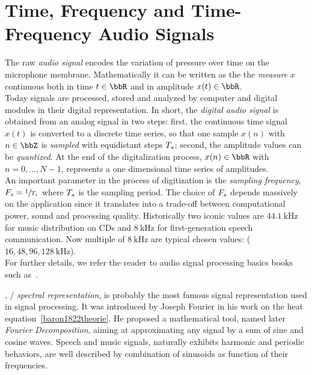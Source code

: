 \section{Time, Frequency and Time-Frequency Audio Signals}
The raw \textit{audio signal} encodes the variation of pressure over time on the microphone membrane.
Mathematically it can be written as the the \textit{measure}
$x$ continuous both in time $t \in \R$ and in amplitude $x(t) \in \R$.
\\Today signals are processed, stored and analyzed by computer and digital modules in their
digital representation.
In short, the \textit{digital audio signal} is obtained from an analog signal in two steps:
first, the continuous time signal $x(t)$ is converted to a discrete time series,
so that one sample $x(n)$ with $n \in \Z$ is \textit{sampled} with equidistant steps $T_s$;
second, the amplitude values can be \textit{quantized}.
At the end of the digitalization process, $x(n) \in \R$ with $n = 0, \dots, N-1$, represents a one dimensional time series of amplitudes.
\\An important parameter in the process of digitization is the \textit{sampling frequency},  $F_s = \sfrac{1}{T_s}$
where $T_s$ is the sampling period.
The choice of $F_s$ depends massively on the application since it translates into a trade-off between computational power, sound and processing quality.
Historically two iconic values are $\SI{44.1}{\kHz}$ for music distribution on CDs and $\SI{8}{\kHz}$ for first-generation speech communication.
Now multiple of $\SI{8}{\kHz}$ are typical chosen values: ($16, 48, 96, \SI{128}{\kHz}$).
\\For further details, we refer the reader to audio signal processing basics books such as~\cite{rocchesso2003introduction}.

, \aka/ \textit{spectral representation}, is probably the most famous signal representation used in signal processing.
It was introduced by Joseph Fourier in his work on the heat equation~\cref{baron1822theorie}.
He proposed a mathematical tool, named later \textit{Fourier Decomposition}, aiming at approximating any signal by a sum of sine and cosine waves.
Speech and music signals, naturally exhibits harmonic and periodic behaviors, are well described
by combination of sinusoids as function of their frequencies.

